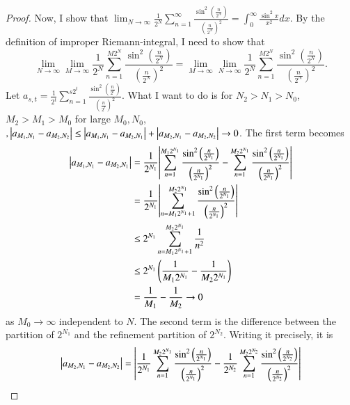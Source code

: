 \documentclass[a4paper, 12pt]{article}
\theoremstyle{Mydefinition}
\theoremstyle{Mytheorem}
\begin{document}
\begin{proof}
Now, I show that $\lim_{N\rightarrow \infty}  \frac{1}{2^N}\sum_{n=1}^{\infty} \frac{\sin^2\left(\frac{n}{2^N}\right)}{\left(\frac{n}{2^N}\right)^2}=\int_0^\infty \frac{\sin^2 x}{x^2}dx$. By the definition of improper Riemann-integral, I need to show that
\begin{equation}
    \lim_{N\rightarrow \infty}\lim_{M\rightarrow \infty} \frac{1}{2^N}\sum_{n=1}^{M2^N}\frac{\sin^2\left(\frac{n}{2^N}\right)}{\left(\frac{n}{2^N}\right)^2} = \lim_{M\rightarrow \infty}\lim_{N\rightarrow \infty} \frac{1}{2^N}\sum_{n=1}^{M2^N}\frac{\sin^2\left(\frac{n}{2^N}\right)}{\left(\frac{n}{2^N}\right)^2}.
\end{equation}
Let $a_{s,t} = \frac{1}{2^t}\sum_{n=1}^{s2^t}\frac{\sin^2\left(\frac{n}{2^t}\right)}{\left(\frac{n}{2^t}\right)^2}$. What I want to do is for $N_2>N_1>N_0$, $M_2>M_1>M_0$ for large $M_0, N_0$, $, \abs{a_{M_1, N_1}-a_{M_2, N_2}}\leq \abs{a_{M_1, N_1}-a_{M_2, N_1}}+\abs{a_{M_2, N_1}-a_{M_2, N_2}}\rightarrow 0$. The first term becomes
\begin{equation}\label{Eq:2}
\begin{split}
    \abs{a_{M_1, N_1}-a_{M_2, N_1}} &= \frac{1}{2^{N_1}}\abs{\sum_{n=1}^{M_1 2^{N_1}}\frac{\sin^2\left(\frac{n}{2^{N_1}}\right)}{\left(\frac{n}{2^{N_1}}\right)^2} - \sum_{n=1}^{M_22^{N_1}}\frac{\sin^2\left(\frac{n}{2^{N_1}}\right)}{\left(\frac{n}{2^{N_1}}\right)^2}} \\
    &= \frac{1}{2^{N_1}}\abs{\sum_{n=M_1 2^{N_1}+1}^{M_2 2^{N_1}}\frac{\sin^2\left(\frac{n}{2^{N_1}}\right)}{\left(\frac{n}{2^{N_1}}\right)^2}} \\
    &\leq 2^{N_1}\sum_{n=M_1 2^{N_1}+1}^{M_2 2^{N_1}}\frac{1}{n^2}\\
    &\leq 2^{N_1}\left(\frac{1}{M_1 2^{N_1}} - \frac{1}{M_2 2^{N_1}}\right) \\
    &= \frac{1}{M_1}-\frac{1}{M_2}\rightarrow 0
\end{split}
\end{equation}
as $M_0\rightarrow \infty$ independent to $N$. The second term is the difference between the partition of $2^{N_1}$ and the refinement partition of $2^{N_2}$. Writing it precisely, it is
\begin{equation}
\begin{split}
    \abs{a_{M_2, N_1}-a_{M_2, N_2}} &= \abs{\frac{1}{2^{N_1}}\sum_{n=1}^{M_2 2^{N_1}}\frac{\sin^2\left(\frac{n}{2^{N_1}}\right)}{\left(\frac{n}{2^{N_1}}\right)^2} - \frac{1}{2^{N_2}}\sum_{n=1}^{M_22^{N_2}}\frac{\sin^2\left(\frac{n}{2^{N_2}}\right)}{\left(\frac{n}{2^{N_2}}\right)^2}}\\

\end{split}
\end{equation}
\end{proof}
\end{document}
